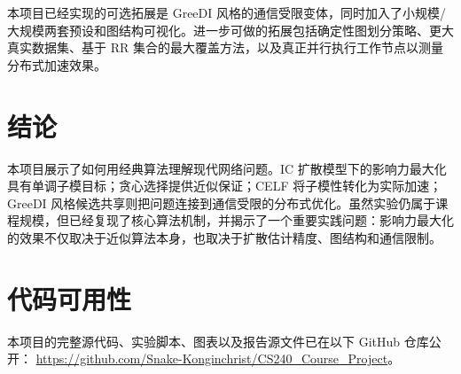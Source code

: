 \documentclass[UTF8, 11pt]{ctexart}
\begin{document}
本项目已经实现的可选拓展是 GreeDI 风格的通信受限变体，同时加入了小规模/大规模两套预设和图结构可视化。进一步可做的拓展包括确定性图划分策略、更大真实数据集、基于 RR 集合的最大覆盖方法，以及真正并行执行工作节点以测量分布式加速效果。

\section{结论}

本项目展示了如何用经典算法理解现代网络问题。IC 扩散模型下的影响力最大化具有单调子模目标；贪心选择提供近似保证；CELF 将子模性转化为实际加速；GreeDI 风格候选共享则把问题连接到通信受限的分布式优化。虽然实验仍属于课程规模，但已经复现了核心算法机制，并揭示了一个重要实践问题：影响力最大化的效果不仅取决于近似算法本身，也取决于扩散估计精度、图结构和通信限制。

\section*{代码可用性}
本项目的完整源代码、实验脚本、图表以及报告源文件已在以下 GitHub 仓库公开：
\url{https://github.com/Snake-Konginchrist/CS240_Course_Project}。
\end{document}
